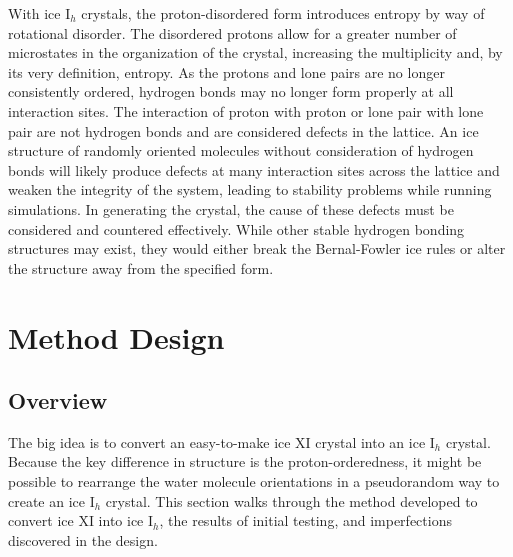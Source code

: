 With ice I$_{h}$ crystals, the proton-disordered form introduces entropy by way of rotational disorder. 
The disordered protons allow for a greater number of microstates in the organization of the crystal, increasing the multiplicity and, by its very definition, entropy.
As the protons and lone pairs are no longer consistently ordered, hydrogen bonds may no longer form properly at all interaction sites. 
The interaction of proton with proton or lone pair with lone pair are not hydrogen bonds and are considered defects in the lattice. 
An ice structure of randomly oriented molecules without consideration of hydrogen bonds will likely produce defects at many interaction sites across the lattice and weaken the integrity of the system, leading to stability problems while running simulations. 
In generating the crystal, the cause of these defects must be considered and countered effectively.
While other stable hydrogen bonding structures may exist, they would either break the Bernal-Fowler ice rules or alter the structure away from the specified form.



\section{Method Design}


\subsection{Overview}

The big idea is to convert an easy-to-make ice XI crystal into an ice I$_{h}$ crystal.
Because the key difference in structure is the proton-orderedness, it might be possible to rearrange the water molecule orientations in a pseudorandom way to create an ice I$_{h}$ crystal.
This section walks through the method developed to convert ice XI into ice I$_{h}$, the results of initial testing, and imperfections discovered in the design.

